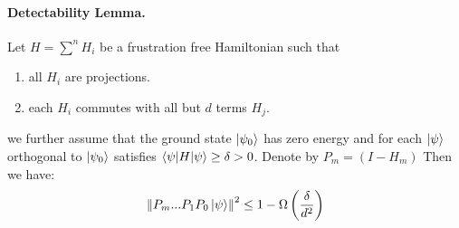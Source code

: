 \usepackage{cancel}
\newcommand{\PPj}[1]{ #1...P_{1}P_{0}\ket{\psi } }
\newcommand{\PPjj}[2]{ #1...P_{1}P_{0}#2\ket{\psi }}
\newcommand{\Observable}[2]{ \braket{#1|#2|#1} }
\newcommand{\Obs}[2]{ \Observable{#1}{#2} }
\newcommand{\LocalHamiltonian }[1]{ \sum^{#1}{H_i} }
\newcommand{\LoH}[1]{\LocalHamiltonian{#1} }
\newcommand{\ham}{Hamiltonian }
\newcommand{\stateGeneral}[1]{\( \ket{#1} \)}
\newcommand{\state } { \ket{\psi} }
\newcommand{\tstate}{\stateGeneral{\psi}}
\newcommand{\norm}[1]{\left\lVert#1\right\rVert}
\newcommand{\Expectation}[2]{ \mathbb{E}_{#2}\left[#1\right]}
\newcommand{\Exp}[2]{\Expectation{#1}{#2}}
\paragraph{Detectability Lemma.}  Let \( H = \LoH{n} \) be a frustration free \ham such that \begin{enumerate}
    \item all \(H_i\) are projections.
    \item each \(H_i\) commutes with all but \(d\) terms \(H_j\).
\end{enumerate}
we further assume that the ground state \stateGeneral{\psi_0} has zero energy and for each \tstate  orthogonal to \stateGeneral{\psi_0} satisfies \( \Obs{\psi}{H} \ge \delta > 0 \). Denote by \( P_m = \left( I - H_m \right) \) Then we have: 
\begin{equation}
    \norm{ \PPj{P_m} }^2 \le 1 - \Omega\left( \frac{\delta}{d^2} \right)  
\end{equation}

